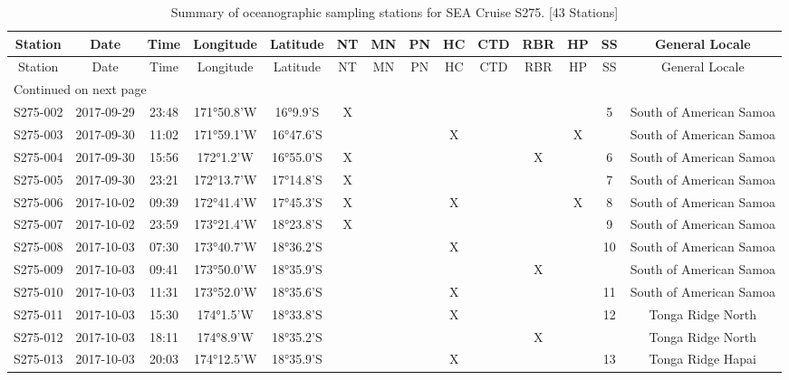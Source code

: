 \begin{longtable}{cccccccccccccc}
\caption{\label{stationSummary} Summary of oceanographic sampling stations for SEA Cruise S275. [43 Stations]} \\ 
 Station & Date & Time & Longitude & Latitude & NT & MN & PN & HC & CTD & RBR & HP & SS & General Locale \\ 
  \hline\n\endfirsthead
Station & Date & Time & Longitude & Latitude & NT & MN & PN & HC & CTD & RBR & HP & SS & General Locale \\ 
\hline
\endhead
\hline
\multicolumn{14}{l}{\footnotesize Continued on next page}
\endfoot
\endlastfoot
 \hline
S275-001 & 2017-09-29 & 10:22 & 171°28.6'W & 15°33.2'S & X &  &  & X &  &  & X & 4 & South of American Samoa \\ 
  S275-002 & 2017-09-29 & 23:48 & 171°50.8'W & 16°9.9'S & X &  &  &  &  &  &  & 5 & South of American Samoa \\ 
  S275-003 & 2017-09-30 & 11:02 & 171°59.1'W & 16°47.6'S &  &  &  & X &  &  & X &  & South of American Samoa \\ 
  S275-004 & 2017-09-30 & 15:56 & 172°1.2'W & 16°55.0'S & X &  &  &  &  & X &  & 6 & South of American Samoa \\ 
  S275-005 & 2017-09-30 & 23:21 & 172°13.7'W & 17°14.8'S & X &  &  &  &  &  &  & 7 & South of American Samoa \\ 
  S275-006 & 2017-10-02 & 09:39 & 172°41.4'W & 17°45.3'S & X &  &  & X &  &  & X & 8 & South of American Samoa \\ 
  S275-007 & 2017-10-02 & 23:59 & 173°21.4'W & 18°23.8'S & X &  &  &  &  &  &  & 9 & South of American Samoa \\ 
  S275-008 & 2017-10-03 & 07:30 & 173°40.7'W & 18°36.2'S &  &  &  & X &  &  &  & 10 & South of American Samoa \\ 
  S275-009 & 2017-10-03 & 09:41 & 173°50.0'W & 18°35.9'S &  &  &  &  &  & X &  &  & South of American Samoa \\ 
  S275-010 & 2017-10-03 & 11:31 & 173°52.0'W & 18°35.6'S &  &  &  & X &  &  &  & 11 & South of American Samoa \\ 
  S275-011 & 2017-10-03 & 15:30 & 174°1.5'W & 18°33.8'S &  &  &  & X &  &  &  & 12 & Tonga Ridge North \\ 
  S275-012 & 2017-10-03 & 18:11 & 174°8.9'W & 18°35.2'S &  &  &  &  &  & X &  &  & Tonga Ridge North \\ 
  S275-013 & 2017-10-03 & 20:03 & 174°12.5'W & 18°35.9'S &  &  &  & X &  &  &  & 13 & Tonga Ridge Hapai \\ 

\end{longtable}
